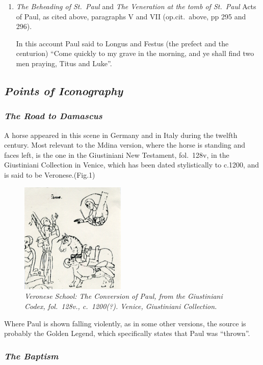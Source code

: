 \documentclass[a4paper,12pt]{article}
\begin{document}
\begin{enumerate}
\item\textit{The Beheading of St.~Paul} and
\textit{The Veneration at the tomb of St.~Paul }
Acts of Paul, as cited above, paragraphs V and VII (op.cit.~above, pp
295 and 296).     

In this account Paul said to Longus and Festus (the prefect and the
centurion) ``Come quickly to my grave in the morning, and ye shall
find two men praying, Titus and Luke''.

\end{enumerate}

\subsection{\textit{Points of Iconography}}

\subsubsection*{\textit{The Road to Damascus}}

A horse appeared in this scene in Germany and in Italy during the
twelfth century.  Most relevant to the Mdina version, where the horse
is standing and faces left, is the one in the Giustiniani New
Testament, fol.~128v, in the Giustiniani Collection in Venice, which
has been dated stylistically to c.1200, and is said to be
Veronese.(Fig.1)
\begin{figure}[htbp]
\centering
\includegraphics[width=5cm]{pics/fig1.png}
\caption[Veronese School: The Conversion of Paul]
{\it Veronese School: The Conversion of Paul, from the
  Giustiniani Codex, fol.~128v., c.~1200(?).  Venice, Giustiniani
  Collection.} 
\end{figure}


Where Paul is shown falling violently, as in some other versions, the
source is probably the Golden Legend, which specifically states that
Paul was ``thrown''.

\subsubsection*{\textit{The Baptism}}
\end{document}
